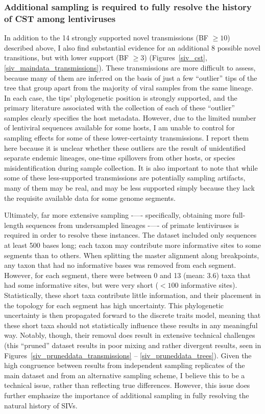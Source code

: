 \subsubsection*{Additional sampling is required to fully resolve the history of CST among lentiviruses}
In addition to the 14 strongly supported novel transmissions (BF $\geq 10$) described above, I also find substantial evidence for an additional 8 possible novel transitions, but with lower support (BF $\geq 3$) (Figures~\ref{siv_cst}, \ref{siv_maindata_transmissions}).
These transmissions are more difficult to assess, because many of them are inferred on the basis of just a few “outlier” tips of the tree that group apart from the majority of viral samples from the same lineage.
In each case, the tips' phylogenetic position is strongly supported, and the primary literature associated with the collection of each of these “outlier” samples clearly specifies the host metadata.
However, due to the limited number of lentiviral sequences available for some hosts, I am unable to control for sampling effects for some of these lower-certainty transmissions.
I report them here because it is unclear whether these outliers are the result of unidentified separate endemic lineages, one-time spillovers from other hosts, or species misidentification during sample collection.
It is also important to note that while some of these less-supported transmissions are potentially sampling artifacts, many of them may be real, and may be less supported simply because they lack the requisite available data for some genome segments.

Ultimately, far more extensive sampling -—- specifically, obtaining more full-length sequences from undersampled lineages -—- of primate lentiviruses is required in order to resolve these instances.
The dataset included only sequences at least 500 bases long; each taxon may contribute more informative sites to some segments than to others.
When splitting the master alignment along breakpoints, any taxon that had no informative bases was removed from each segment.
However, for each segment, there were between 0 and 13 (mean: 3.6) taxa that had some informative sites, but were very short ($<100$ informative sites).
Statistically, these short taxa contribute little information, and their placement in the topology for each segment has high uncertainty.
This phylogenetic uncertainty is then propagated forward to the discrete traits model, meaning that these short taxa should not statistically influence these results in any meaningful way.
Notably, though, their removal does result in extensive technical challenges (this “pruned” dataset results in poor mixing and rather divergent results, seen in Figures~\ref{siv_pruneddata_transmissions} -- \ref{siv_pruneddata_trees}).
Given the high congruence between results from independent sampling replicates of the main dataset and from an alternative sampling scheme, I believe this to be a technical issue, rather than reflecting true differences.
However, this issue does further emphasize the importance of additional sampling in fully resolving the natural history of SIVs.

